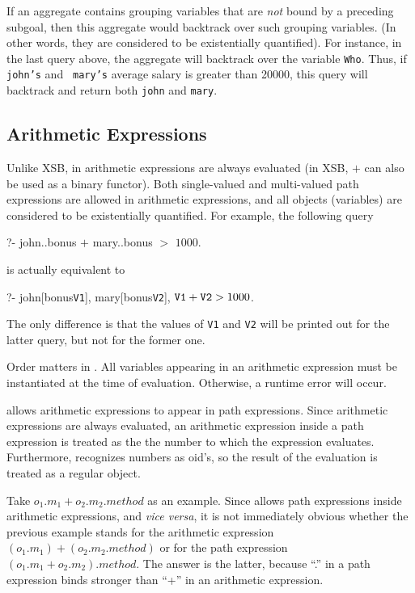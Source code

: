 \documentclass[11pt]{report}
\begin{document}
If an aggregate contains grouping variables that are \emph{not} bound by a
preceding subgoal, then this aggregate would backtrack over such grouping
variables. (In other words, they are considered to be existentially
quantified). For instance, in the last query above, the aggregate will
backtrack over the variable {\tt Who}. Thus, if {\tt john's} and {\tt
  mary's} average salary is greater than 20000, this query will backtrack
and return both {\tt john} and {\tt mary}.

\subsection{Arithmetic Expressions}

Unlike XSB, in \FLORA arithmetic expressions are always evaluated (in XSB,
$+$ can also be used as a binary functor). Both single-valued and
multi-valued path expressions are allowed in arithmetic expressions, and
all objects (variables) are considered to be existentially quantified. For
example, the following query
\begin{qrules}
?- john..bonus $+$ mary..bonus $>$ $1000$.
\end{qrules}
is actually equivalent to
\begin{qrules}
?- john[bonus{\mvd}{\tt V1}], mary[bonus{\mvd}{\tt V2}], ${\tt V1}+{\tt V2} > 1000$.
\end{qrules}
The only difference is that the values of {\tt V1} and {\tt V2} will be
printed out for the latter query, but not for the former one.

Order matters in \FLORA. All variables appearing in an arithmetic
expression must be instantiated at the time of evaluation. Otherwise, a
runtime error will occur.

\FLORA allows arithmetic expressions to appear in path expressions. Since
arithmetic expressions are always evaluated, an arithmetic expression
inside a path expression is treated as the the number to which the
expression evaluates. Furthermore, \FLORA recognizes numbers as oid's, so
the result of the evaluation is treated as a regular object.

Take $o_1.m_1+o_2.m_2.method$ as an example. Since \FLORA allows path
expressions inside arithmetic expressions, and {\it vice versa}, it is not
immediately obvious whether the previous example stands for the arithmetic
expression $(o_1.m_1)+(o_2.m_2.method)$ or for the path expression
$(o_1.m_1+o_2.m_2).method$. The answer is the latter, because ``.'' in a
path expression binds stronger than ``+'' in an arithmetic expression.
\end{document}
